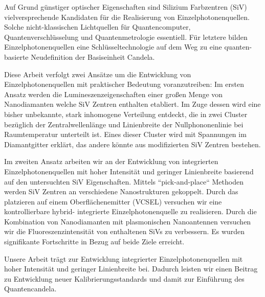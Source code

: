	Auf Grund günstiger optischer Eigenschaften sind Silizium Farbzentren (SiV) vielversprechende Kandidaten für die Realisierung von Einzelphotonenquellen. Solche nicht-klassischen Lichtquellen für Quantencomputer, Quantenverschlüsselung und Quantenmetrologie essentiell. Für letztere bilden Einzelphotonenquellen eine Schlüsseltechnologie auf dem Weg zu eine quanten-basierte Neudefinition der Basiseinheit Candela.

	Diese Arbeit verfolgt zwei Ansätze um die Entwicklung von Einzelphotonenquellen mit praktischer Bedeutung voranzutreiben: 
	Im ersten Ansatz werden die Lumineszenzeigenschaften einer großen Menge von Nanodiamanten welche SiV Zentren enthalten etabliert. 
	Im Zuge dessen wird eine bisher unbekannte, stark inhomogene Verteilung entdeckt, die in zwei Cluster bezüglich der Zentralwellenlänge und Linienbreite der Nullphononenlinie bei Raumtemperatur unterteilt ist.
	Eines dieser Cluster wird mit Spannungen im Diamantgitter erklärt, das andere könnte aus modifizierten SiV Zentren bestehen.

	Im zweiten Ansatz arbeiten wir an der Entwicklung von integrierten Einzelphotonenquellen mit hoher Intensität und geringer Linienbreite basierend auf den untersuchten SiV Eigenschaften. Mittels “pick-and-place“ Methoden werden SiV Zentren an verschiedene Nanostrukturen gekoppelt. 
	Durch das platzieren auf einem Oberflächenemitter (VCSEL) versuchen wir eine kontrollierbare hybrid- integrierte Einzelphotonenquelle zu realisieren. 
	Durch die Kombination von Nanodiamanten mit plasmonischen Nanoantennen versuchen wir die Fluoreszenzintensität von enthaltenen SiVs zu verbessern. 
	Es wurden signifikante Fortschritte in Bezug auf beide Ziele erreicht.

	Unsere Arbeit trägt zur Entwicklung integrierter Einzelphotonenquellen mit hoher Intensität und geringer Linienbreite bei. 
	Dadurch leisten wir einen Beitrag zu Entwicklung neuer Kalibrierungsstandards und damit zur Einführung des Quantencandela. 

\vfill
